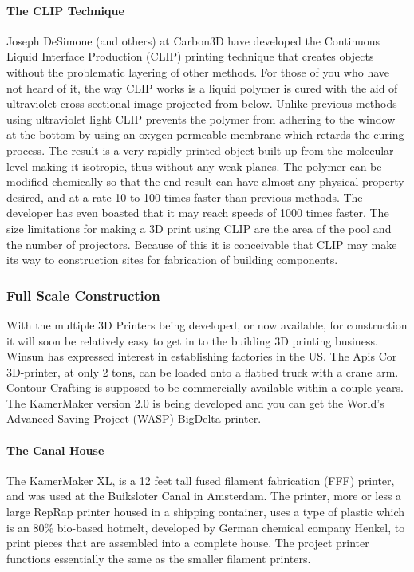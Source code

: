 \documentclass[12pt]{article}
\begin{document}
\paragraph{The CLIP Technique}
Joseph DeSimone (and others) at Carbon3D have developed the Continuous Liquid Interface Production (CLIP) printing technique that creates objects without the problematic layering of other methods.  For those of you who have not heard of it, the way CLIP works is a liquid polymer is cured with the aid of ultraviolet cross sectional image projected from below.  Unlike previous methods using ultraviolet light CLIP prevents the polymer from adhering to the window at the bottom by using an oxygen-permeable membrane which retards the curing process.  The result is a very rapidly printed object built up from the molecular level making it isotropic, thus without any weak planes.  The polymer can be modified chemically so that the end result can have almost any physical property desired, and at a rate 10 to 100 times faster than previous methods.  The developer has even boasted that it may reach speeds of 1000 times faster.  The size limitations for making a 3D print using CLIP are the area of the pool and the number of projectors.  Because of this it is conceivable that CLIP may make its way to construction sites for fabrication of building components.
\subsubsection{Full Scale Construction}
With the multiple 3D Printers being developed, or now available, for construction it will soon be relatively easy to get in to the building 3D printing business.  Winsun has expressed interest in establishing factories in the US.  The Apis Cor 3D-printer, at only 2 tons, can be loaded onto a flatbed truck with a crane arm.  Contour Crafting is supposed to be commercially available within a couple years.  The KamerMaker version 2.0 is being developed and you can get the World’s Advanced Saving Project (WASP) BigDelta printer.
\paragraph{The Canal House}
The KamerMaker XL, is a 12 feet tall fused filament fabrication (FFF) printer, and was used at the Buiksloter Canal in Amsterdam. The printer, more or less a large RepRap printer housed in a shipping container, uses a type of plastic which is an 80\% bio-based hotmelt, developed by German chemical company Henkel, to print pieces that are assembled into a complete house. The project printer functions essentially the same as the smaller filament printers.
\end{document}
